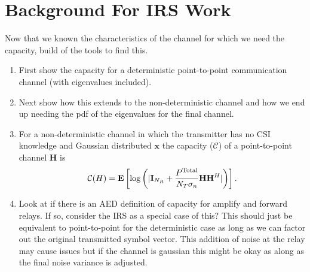 \documentclass[12pt,a4paper]{report}
\begin{document}
\section{Background For IRS Work}
Now that we known the characteristics of the channel for which we need the capacity, build of the tools to find this.
\begin{enumerate}
\item First show the capacity for a deterministic point-to-point communication channel (with eigenvalues included).
\item Next show how this extends to the non-deterministic channel and how we end up needing the pdf of the eigenvalues for the final channel.
\item For a non-deterministic channel in which the transmitter has no CSI knowledge and Gaussian distributed $\mathbf{x}$ the capacity ($\mathcal{C}$) of a point-to-point channel $\mathbf{H}$ is 
\begin{equation}
\mathcal{C{}}{(H)} = \mathop{\bf E{}}\left[\text{log{}}\left(|\mathbf{I}_{N_R}+\frac{P^{\text{Total}}}{N_T \sigma_n}\mathbf{H}\mathbf{H}^H|\right)\right].
\end{equation}
%


\item Look at if there is an AED definition of capacity for amplify and forward relays. If so, consider the IRS as a special case of this? This should just be equivalent to point-to-point for the deterministic case as long as we can factor out the original transmitted symbol vector. This addition of noise at the relay may cause issues but if the channel is gaussian this might be okay as along as the final noise variance is adjusted.

\end{enumerate}


\end{document}
